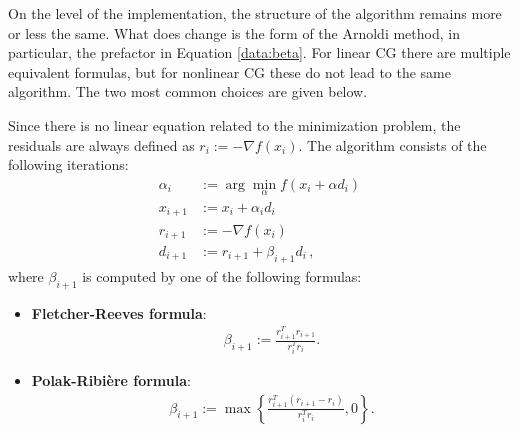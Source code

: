     On the level of the implementation, the structure of the algorithm remains more or less the same. What does change is the form of the Arnoldi method, in particular, the prefactor in Equation \eqref{data:beta}. For linear CG there are multiple equivalent formulas, but for nonlinear CG these do not lead to the same algorithm. The two most common choices are given below.
    \begin{method}[Nonlinear CG]
        Since there is no linear equation related to the minimization problem, the residuals are always defined as $r_i:=-\nabla f(x_i)$. The algorithm consists of the following iterations:
        \begin{align}
            \alpha_i &:= \arg\min_\alpha f(x_i+\alpha d_i)\label{data:argmin}\\
            x_{i+1} &:= x_i+\alpha_id_i\\
            r_{i+1} &:= -\nabla f(x_i)\\
            d_{i+1} &:= r_{i+1}+\beta_{i+1}d_i\,,
        \end{align}
        where $\beta_{i+1}$ is computed by one of the following formulas:
        \begin{itemize}
            \item \textbf{Fletcher-Reeves formula}:
                \begin{gather}
                    \beta_{i+1} := \frac{r_{i+1}^Tr_{i+1}}{r_i^Tr_i}.
                \end{gather}
            \item \textbf{Polak-Ribi\`ere formula}:
                \begin{gather}
                    \label{data:polak_ribiere}
                    \beta_{i+1} := \max\left\{\frac{r_{i+1}^T(r_{i+1}-r_i)}{r_i^Tr_i}, 0\right\}.
                \end{gather}
        \end{itemize}
    \end{method}

